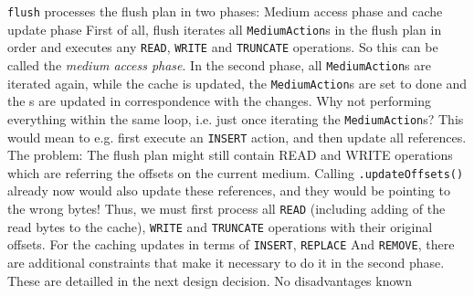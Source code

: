 {%
\texttt{flush} processes the flush plan in two phases: Medium access phase and cache update phase
}
{%
First of all, flush iterates all \texttt{MediumAction}s in the flush plan in order and executes any \texttt{READ}, \texttt{WRITE} and \texttt{TRUNCATE} operations. So this can be called the \emph{medium access phase}. In the second phase, all \texttt{MediumAction}s are iterated again, while the cache is updated, the \texttt{MediumAction}s are set to done and the \IMediumReference{}s are updated in correspondence with the changes.
}
{%
Why not performing everything within the same loop, i.e. just once iterating the \texttt{MediumAction}s? This would mean to e.g. first execute an \texttt{INSERT} action, and then update all references. The problem: The flush plan might still contain READ and WRITE operations which are referring the offsets on the current medium. Calling \MediumReferenceRepository{}\texttt{.updateOffsets()} already now would also update these references, and they would be pointing to the wrong bytes! Thus, we must first process all \texttt{READ} (including adding of the read bytes to the cache), \texttt{WRITE} and \texttt{TRUNCATE} operations with their original offsets. For the caching updates in terms of \texttt{INSERT}, \texttt{REPLACE} And \texttt{REMOVE}, there are additional constraints that make it necessary to do it in the second phase. These are detailled in the next design decision.
}
{%
No disadvantages known
}

